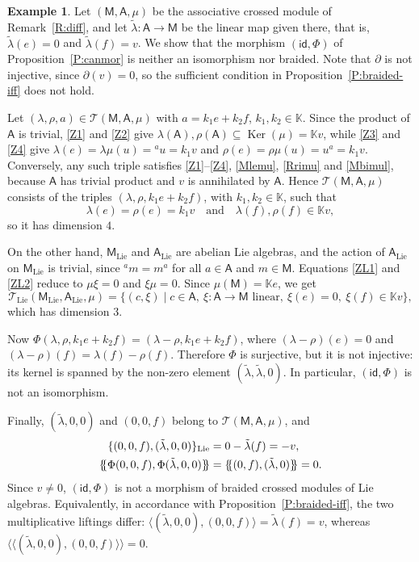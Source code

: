 \documentclass[12pt,reqno]{amsart}
\theoremstyle{plain}
\theoremstyle{definition}
\newtheorem{example}[theorem]{Example}
\theoremstyle{remark}
\def\lam{\lambda}
\def\Ker{\operatorname{Ker}}
\newcommand{\K}{\ensuremath{\mathbb{K}}}
\newcommand{\A}{\ensuremath{\mathsf{A}}}
\newcommand{\id}{\ensuremath{\mathsf{id}}}
\newcommand*{\ldblbrace}{\{\mskip-5mu\{}
\newcommand*{\rdblbrace}{\}\mskip-5mu\}}
\newcommand{\MM}{\ensuremath{\mathsf{M}}}
\newcommand{\T}{\ensuremath{\mathcal{T}}}
\numberwithin{equation}{section}
\begin{document}
\begin{example}
	Let $(\MM,\A,\mu)$ be the associative crossed module of Remark~\ref{R:diff}, and let $\tilde{\lam}\colon\A\to\MM$ be the linear map given there,
	 that is, $\tilde{\lam}(e)=0$ and $\tilde{\lam}(f)=v$. We show that the morphism $(\id,\Phi)$ of Proposition~\ref{P:canmor} is neither an isomorphism nor braided.
	  Note that $\partial$ is not injective, since $\partial(v)=0$, so the sufficient condition in Proposition~\ref{P:braided-iff} does not hold.
	
	Let $(\lam,\rho,a)\in\T(\MM,\A,\mu)$ with $a=k_1 e+k_2 f$, $k_1,k_2\in\K$. Since the product of $\A$ is trivial, \eqref{Z1} and \eqref{Z2} give $\lam(\A),\rho(\A)\subseteq\Ker(\mu)=\K v$,
	 while \eqref{Z3} and \eqref{Z4} give $\lam(e)=\lam\mu(u)={}^au=k_1 v$ and $\rho(e)=\rho\mu(u)=u^a=k_1 v$. Conversely, any such triple satisfies \eqref{Z1}--\eqref{Z4}, 
	 \eqref{Mlemu}, \eqref{Rrimu} and \eqref{Mbimul}, because $\A$ has trivial product and $v$ is annihilated by $\A$. Hence $\T(\MM,\A,\mu)$ consists of the triples 
	 $(\lam,\rho,k_1 e+k_2 f)$, with $k_1,k_2\in\K$, such that
	\[
	\lam(e)=\rho(e)=k_1 v \quad\text{and}\quad \lam(f),\rho(f)\in\K v,
	\]
	so it has dimension $4$.
	
	On the other hand, $\MM_{\text{Lie}}$ and $\A_{\text{Lie}}$ are abelian Lie algebras, and the action of $\A_{\text{Lie}}$ on $\MM_{\text{Lie}}$ is trivial,
	 since ${}^am=m^a$ for all $a\in\A$ and $m\in\MM$. Equations \eqref{ZL1} and \eqref{ZL2} reduce to $\mu\xi=0$ and $\xi\mu=0$. Since $\mu(\MM)=\K e$, we get
	\[
	\T_{\text{Lie}}(\MM_{\text{Lie}},\A_{\text{Lie}},\mu)=\{(c,\xi)\mid c\in\A,\ \xi\colon\A\to\MM \text{ linear},\ \xi(e)=0,\ \xi(f)\in\K v\},
	\]
	which has dimension $3$.
	
	Now $\Phi(\lam,\rho,k_1 e+k_2 f)=(\lam-\rho,k_1 e+k_2 f)$, where $(\lam-\rho)(e)=0$ and $(\lam-\rho)(f)=\lam(f)-\rho(f)$.
	 Therefore $\Phi$ is surjective, but it is not injective: its kernel is spanned by the non-zero element $(\tilde{\lam},\tilde{\lam},0)$.
	  In particular, $(\id,\Phi)$ is not an isomorphism.
	
	Finally, $(\tilde{\lam},0,0)$ and $(0,0,f)$ belong to $\T(\MM,\A,\mu)$, and
	\begin{align*}
		\{(0,0,f),(\tilde{\lam},0,0)\}_{\text{Lie}}&=0-\tilde{\lam}(f)=-v,\\
		\ldblbrace \Phi(0,0,f),\Phi(\tilde{\lam},0,0) \rdblbrace &=\ldblbrace (0,f),(\tilde{\lam},0) \rdblbrace=0.
	\end{align*}
	Since $v\neq0$, $(\id,\Phi)$ is not a morphism of braided crossed modules of Lie algebras. Equivalently, in accordance with Proposition~\ref{P:braided-iff},
	 the two multiplicative liftings differ: $\langle(\tilde{\lam},0,0),(0,0,f)\rangle=\tilde{\lam}(f)=v$, whereas $\langle\!\langle(\tilde{\lam},0,0),(0,0,f)\rangle\!\rangle=0$.
\end{example}
\end{document}
